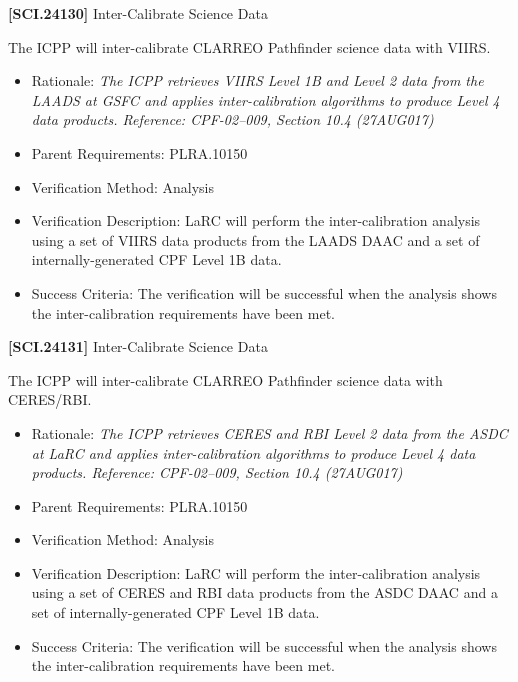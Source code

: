 \documentclass[12pt,oneside,oldfontcommands]{memoir}
\begin{document}
\textbf{[SCI.24130]} Inter-Calibrate Science Data

The \gls{ICPP} will inter-calibrate \gls{CLARREO} Pathfinder science data with \gls{VIIRS}.

\begin{itemize}
\item{} Rationale: \emph{The ICPP retrieves VIIRS Level 1B and Level 2 data from the LAADS at GSFC and applies inter-calibration algorithms to produce Level 4 data products. Reference: CPF-02--009, Section 10.4 (27AUG017)}

\item{} Parent Requirements: PLRA.10150

\item{} Verification Method: Analysis

\item{} Verification Description: \gls{LaRC} will perform the inter-calibration \gls{analysis} using a set of \gls{VIIRS} data products from the \gls{LAADS} \gls{DAAC} and a set of internally-generated \gls{CPF} Level 1B data.

\item{} Success Criteria: The verification will be successful when the \gls{analysis} shows the inter-calibration requirements have been met.

\end{itemize}

\textbf{[SCI.24131]} Inter-Calibrate Science Data

The \gls{ICPP} will inter-calibrate \gls{CLARREO} Pathfinder science data with \gls{CERES}\slash \gls{RBI}.

\begin{itemize}
\item{} Rationale: \emph{The ICPP retrieves CERES and RBI Level 2 data from the ASDC at LaRC and applies inter-calibration algorithms to produce Level 4 data products. Reference: CPF-02--009, Section 10.4 (27AUG017)}

\item{} Parent Requirements: PLRA.10150

\item{} Verification Method: Analysis

\item{} Verification Description: \gls{LaRC} will perform the inter-calibration \gls{analysis} using a set of \gls{CERES} and \gls{RBI} data products from the \gls{ASDC} \gls{DAAC} and a set of internally-generated \gls{CPF} Level 1B data.

\item{} Success Criteria: The verification will be successful when the \gls{analysis} shows the inter-calibration requirements have been met.

\end{itemize}
\end{document}
